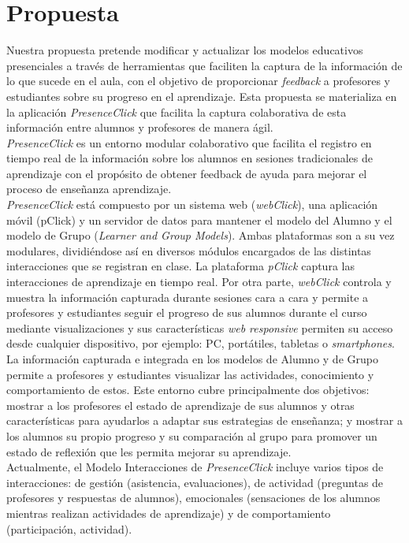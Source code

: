 \section{Propuesta}

Nuestra propuesta pretende modificar y actualizar los modelos educativos presenciales a través de herramientas que faciliten la captura de la información de lo que sucede en el aula, con el objetivo de proporcionar \textit{feedback} a profesores y estudiantes sobre su progreso en el aprendizaje. Esta propuesta se materializa en la aplicación \textit{PresenceClick} que facilita la captura colaborativa de esta información entre alumnos y profesores de manera ágil.\\

\textit{PresenceClick} es un entorno modular colaborativo que facilita el registro en tiempo real de la información sobre los alumnos en sesiones tradicionales de aprendizaje con el propósito de obtener feedback de ayuda para mejorar el proceso de enseñanza aprendizaje.\\ 

\textit{PresenceClick} está compuesto por un sistema web (\textit{webClick}), una aplicación móvil (pClick) y un servidor de datos para mantener el modelo del Alumno y el modelo de Grupo (\textit{Learner and Group Models}). Ambas plataformas son a su vez modulares, dividiéndose así en diversos módulos encargados de las distintas interacciones que se registran en clase. La plataforma \textit{pClick} captura las interacciones de aprendizaje en tiempo real. Por otra parte, \textit{webClick} controla y muestra la información capturada durante sesiones cara a cara y permite a profesores y estudiantes seguir el progreso de sus alumnos durante el curso mediante visualizaciones y sus características \textit{web responsive} permiten su acceso desde cualquier dispositivo, por ejemplo: PC, portátiles, tabletas o \textit{smartphones}. La información capturada e integrada en los modelos de Alumno y de Grupo permite a profesores y estudiantes visualizar las actividades, conocimiento y comportamiento de estos. Este entorno cubre principalmente dos objetivos: mostrar a los profesores el estado de aprendizaje de sus alumnos y otras características para ayudarlos a adaptar sus estrategias de enseñanza; y mostrar a los alumnos su propio progreso y su comparación al grupo para promover un estado de reflexión que les permita mejorar su aprendizaje.\\

Actualmente, el Modelo Interacciones de \textit{PresenceClick} incluye varios tipos de interacciones: de gestión (asistencia, evaluaciones), de actividad (preguntas de profesores y respuestas de alumnos), emocionales (sensaciones de los alumnos mientras realizan actividades de aprendizaje) y de comportamiento (participación, actividad).\\

